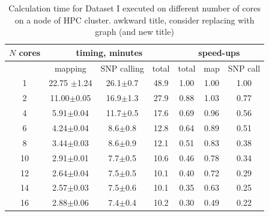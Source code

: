 \documentclass[11pt, oneside]{article}   	%
\newcommand{\COMMENT}[1]{{\color{red} #1 }}
\begin{document}
\begin{table}[tb]
\small
\caption{Calculation time for Dataset I executed on different number of cores on a node of HPC cluster. \COMMENT{awkward title, consider replacing with graph (and new title)}}
\begin{center}
\begin{tabular}{c|c|c|c|ccc}
$N$ cores	&\multicolumn{3}{c|}{timing, minutes}&\multicolumn{3}{c}{speed-ups} \\
\hline
	& mapping 	&	SNP calling	&	total  &total & map& SNP call\\
\hline
1	&	22.75	$\pm$1.24&	26.1$\pm$0.7	&	48.9	&	 1.00	&	1.00	&	1.00\\
2	&	11.00$\pm$0.05	&	16.9$\pm$1.3	&	27.9	&	 0.88	&	1.03	&	0.77\\
4	&	5.91$\pm$0.04	&	11.7$\pm$0.5	&	17.6	&	 0.69	&	0.96	&	0.56\\
6	&	4.24$\pm$0.04	&	8.6$\pm$0.8	&	12.8	&	 0.64	&	0.89	&	0.51\\
8	&	3.44$\pm$0.03	&	8.6$\pm$0.9	&	12.1	&	 0.51	&	0.83	&	0.38\\
10	&	2.91$\pm$0.01	&	7.7$\pm$0.5	&	10.6	&	 0.46	&	0.78	&	0.34\\
12	&	2.64$\pm$0.04	&	7.5$\pm$0.5	&	10.1	&	 0.40	&	0.72	&	0.29\\
14	&	2.57$\pm$0.03	&	7.5$\pm$0.6	&	10.1	&	 0.35	&	0.63	&	0.25\\
16	&	2.88$\pm$0.06	&	7.4$\pm$0.4	&	10.2	&	 0.30	&	0.49	&	0.22\\
\end{tabular}
\end{center}
\label{table:3}
\normalsize
\end{table}
\end{document}

